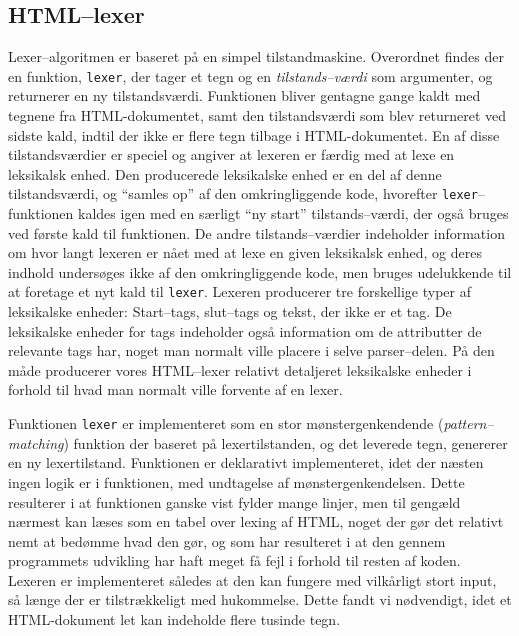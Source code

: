\documentclass[a4paper,oneside]{memoir}
\begin{document}
\subsection{HTML--lexer}
\label{htmllexerimpl}
Lexer--algoritmen er baseret på en simpel tilstandmaskine. Overordnet
findes der en funktion, \texttt{lexer}, der tager et tegn og en
\textit{tilstands--værdi} som argumenter, og returnerer en ny
tilstandsværdi. Funktionen bliver gentagne gange kaldt med tegnene fra
HTML-dokumentet, samt den tilstandsværdi som blev returneret ved
sidste kald, indtil der ikke er flere tegn tilbage i
HTML-dokumentet. En af disse tilstandsværdier er speciel og angiver at
lexeren er færdig med at lexe en leksikalsk enhed. Den producerede
leksikalske enhed er en del af denne tilstandsværdi, og ``samles op''
af den omkringliggende kode, hvorefter \texttt{lexer}--funktionen
kaldes igen med en særligt ``ny start'' tilstands--værdi, der også
bruges ved første kald til funktionen. De andre tilstands--værdier
indeholder information om hvor langt lexeren er nået med at lexe en
given leksikalsk enhed, og deres indhold undersøges ikke af den
omkringliggende kode, men bruges udelukkende til at foretage et nyt
kald til \texttt{lexer}. Lexeren producerer tre forskellige typer af
leksikalske enheder: Start--tags, slut--tags og tekst, der ikke er et
tag. De leksikalske enheder for tags indeholder også information om de
attributter de relevante tags har, noget man normalt ville placere i
selve parser--delen. På den måde producerer vores HTML--lexer relativt
detaljeret leksikalske enheder i forhold til hvad man normalt ville
forvente af en lexer.

Funktionen \texttt{lexer} er implementeret som en stor
mønstergenkendende (\textit{pattern--matching}) funktion der baseret
på lexertilstanden, og det leverede tegn, genererer en ny
lexertilstand. Funktionen er deklarativt implementeret, idet der
næsten ingen logik er i funktionen, med undtagelse af
mønstergenkendelsen. Dette resulterer i at funktionen ganske vist
fylder mange linjer, men til gengæld nærmest kan læses som en tabel
over lexing af HTML, noget der gør det relativt nemt at bedømme hvad
den gør, og som har resulteret i at den gennem programmets udvikling
har haft meget få fejl i forhold til resten af koden. Lexeren er
implementeret således at den kan fungere med vilkårligt stort input,
så længe der er tilstrækkeligt med hukommelse. Dette fandt vi
nødvendigt, idet et HTML-dokument let kan indeholde flere tusinde
tegn.
\end{document}
